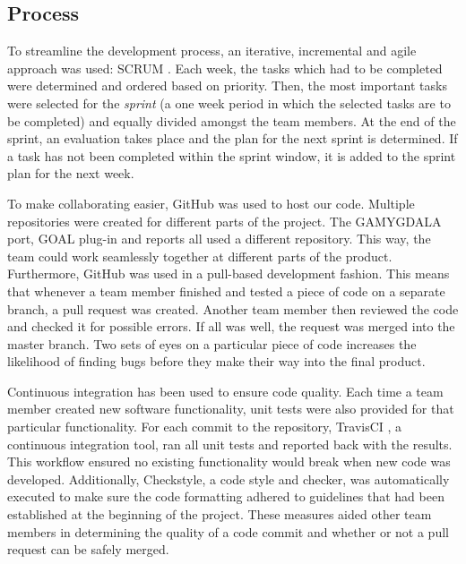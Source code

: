 \subsection{Process}
To streamline the development process, an iterative, incremental and agile approach was used: SCRUM \citep{scrum}. Each week, the tasks which had to be completed were determined and ordered based on priority. Then, the most important tasks were selected for the \textit{sprint} (a one week period in which the selected tasks are to be completed) and equally divided amongst the team members. At the end of the sprint, an evaluation takes place and the plan for the next sprint is determined. If a task has not been completed within the sprint window, it is added to the sprint plan for the next week.

To make collaborating easier, GitHub \citep{gh} was used to host our code. Multiple repositories were created for different parts of the project. The GAMYGDALA port, GOAL plug-in and reports all used a different repository. This way, the team could work seamlessly together at different parts of the product. Furthermore, GitHub was used in a pull-based development fashion. This means that whenever a team member finished and tested a piece of code on a separate branch, a pull request was created. Another team member then reviewed the code and checked it for possible errors. If all was well, the request was merged into the master branch. Two sets of eyes on a particular piece of code increases the likelihood of finding bugs before they make their way into the final product. 

Continuous integration has been used to ensure code quality. Each time a team member created new software functionality, unit tests were also provided for that particular functionality. For each commit to the repository, TravisCI \citep{travis}, a continuous integration tool, ran all unit tests and reported back with the results. This workflow ensured no existing functionality would break when new code was developed. Additionally, Checkstyle, a code style and checker, was automatically executed to make sure the code formatting adhered to guidelines that had been established at the beginning of the project. These measures aided other team members in determining the quality of a code commit and whether or not a pull request can be safely merged.